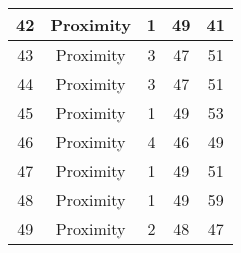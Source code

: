 \documentclass[results.tex]{subfiles}
\begin{document}
\begin{center}
\begin{tabular}{| c || c | c | c | c |}
            \hline
            42                      & Proximity                    & 1                      & 49                      & 41                   \\
            \hline
            43                      & Proximity                    & 3                      & 47                      & 51                   \\
            \hline
            44                      & Proximity                    & 3                      & 47                      & 51                   \\
            \hline
            45                      & Proximity                    & 1                      & 49                      & 53                   \\
            \hline
            46                      & Proximity                    & 4                      & 46                      & 49                   \\
            \hline
            47                      & Proximity                    & 1                      & 49                      & 51                   \\
            \hline
            48                      & Proximity                    & 1                      & 49                      & 59                   \\
            \hline
            49                      & Proximity                    & 2                      & 48                      & 47                   \\
            \hline
        \end{tabular}
    \end{center}
\end{document}
